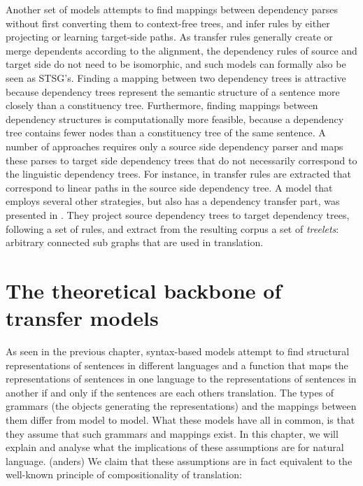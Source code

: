 \documentclass{report}
\theoremstyle{definition}
\theoremstyle{plain}
\begin{document}
Another set of models attempts to find mappings between dependency parses without first converting them to context-free trees, and infer rules by either projecting or learning target-side paths. As transfer rules generally create or merge dependents according to the alignment, the dependency rules of source and target side do not need to be isomorphic, and such models can formally also be seen as STSG's. Finding a mapping between two dependency trees is attractive because dependency trees represent the semantic structure of a sentence more closely than a constituency tree. Furthermore, finding mappings between dependency structures is computationally more feasible, because a dependency tree contains fewer nodes than a constituency tree of the same sentence. A number of approaches requires only a source side dependency parser and maps these parses to target side dependency trees that do not necessarily correspond to the linguistic dependency trees. For instance, in \cite{lin2004path} transfer rules are extracted that correspond to linear paths in the source side dependency tree. A model that employs several other strategies, but also has a dependency transfer part, was presented in \cite{quirk2005dependency,quirk2006dependency,quirk2006we}. They project source dependency trees to target dependency trees, following a set of rules, and extract from the resulting corpus a set of \textit{treelets}: arbitrary connected sub graphs that are used in translation.

\cite{quirk2006dependency}
\cite{menezes2003best}










\chapter{The theoretical backbone of transfer models}



As seen in the previous chapter, syntax-based models attempt to find structural representations of sentences in different languages and a function that maps the representations of sentences in one language to the representations of sentences in another if and only if the sentences are each others translation. The types of grammars (the objects generating the representations) and the mappings between them differ from model to model. What these models have all in common, is that they assume that such grammars and mappings exist. In this chapter, we will explain and analyse what the implications of these assumptions are for natural language. (anders) We claim that these assumptions are in fact equivalent to the well-known principle of compositionality of translation:
\end{document}
